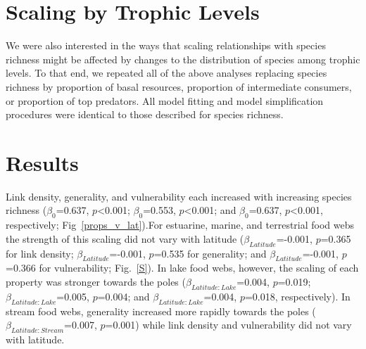 \documentclass[12pt]{article}
\begin{document}
  \section*{Scaling by Trophic Levels}

    We were also interested in the ways that scaling relationships with species richness might
    be affected by changes to the distribution of species among trophic levels. To
    that end, we repeated all of the above analyses replacing species richness by
    proportion of basal resources, proportion of intermediate consumers,
    or proportion of top predators. All model fitting and model
    simplification procedures were identical to those described for species
    richness.


\section*{Results}

  Link density, generality, and vulnerability each increased with increasing
  species richness ($\beta_0$=0.637, $p$\textless0.001; $\beta_0$=0.553,
  $p$\textless0.001; and $\beta_0$=0.637, $p$\textless0.001, respectively;
  Fig~\ref{props_v_lat}).For estuarine, marine, and terrestrial food webs the
  strength of this scaling did not vary with latitude
  ($\beta_{Latitude}$=-0.001, $p$=0.365 for link density;
  $\beta_{Latitude}$=-0.001, $p$=0.535 for generality; and
  $\beta_{Latitude}$=-0.001, $p$=0.366 for vulnerability; Fig.~\ref{S}). In
  lake food webs, however, the scaling of each property was stronger towards
  the poles ($\beta_{Latitude:Lake}$=0.004, $p$=0.019;
  $\beta_{Latitude:Lake}$=0.005, $p$=0.004; and
  $\beta_{Latitude:Lake}$=0.004, $p$=0.018, respectively). In stream food
  webs, generality increased more rapidly towards the poles
  ($\beta_{Latitude:Stream}$=0.007, $p$=0.001) while link density and
  vulnerability did not vary with latitude.
\end{document}
